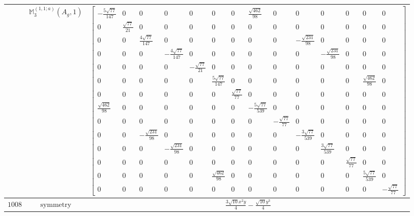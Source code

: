 \documentclass[fleqn,8pt,landscape]{jsarticle}
\begin{document}
\begin{longtable}{ccc}
$  $ & $ \mathbb{M}_{3}^{(1,1;a)}(A_{g},1) $ & $ \begin{bmatrix} - \frac{5 \sqrt{77}}{147} & 0 & 0 & 0 & 0 & 0 & 0 & \frac{\sqrt{462}}{98} & 0 & 0 & 0 & 0 & 0 & 0 \\ 0 & \frac{\sqrt{77}}{21} & 0 & 0 & 0 & 0 & 0 & 0 & 0 & 0 & 0 & 0 & 0 & 0 \\ 0 & 0 & \frac{4 \sqrt{77}}{147} & 0 & 0 & 0 & 0 & 0 & 0 & - \frac{\sqrt{231}}{98} & 0 & 0 & 0 & 0 \\ 0 & 0 & 0 & - \frac{4 \sqrt{77}}{147} & 0 & 0 & 0 & 0 & 0 & 0 & - \frac{\sqrt{231}}{98} & 0 & 0 & 0 \\ 0 & 0 & 0 & 0 & - \frac{\sqrt{77}}{21} & 0 & 0 & 0 & 0 & 0 & 0 & 0 & 0 & 0 \\ 0 & 0 & 0 & 0 & 0 & \frac{5 \sqrt{77}}{147} & 0 & 0 & 0 & 0 & 0 & 0 & \frac{\sqrt{462}}{98} & 0 \\ 0 & 0 & 0 & 0 & 0 & 0 & \frac{\sqrt{77}}{77} & 0 & 0 & 0 & 0 & 0 & 0 & 0 \\ \frac{\sqrt{462}}{98} & 0 & 0 & 0 & 0 & 0 & 0 & - \frac{5 \sqrt{77}}{539} & 0 & 0 & 0 & 0 & 0 & 0 \\ 0 & 0 & 0 & 0 & 0 & 0 & 0 & 0 & - \frac{\sqrt{77}}{77} & 0 & 0 & 0 & 0 & 0 \\ 0 & 0 & - \frac{\sqrt{231}}{98} & 0 & 0 & 0 & 0 & 0 & 0 & - \frac{3 \sqrt{77}}{539} & 0 & 0 & 0 & 0 \\ 0 & 0 & 0 & - \frac{\sqrt{231}}{98} & 0 & 0 & 0 & 0 & 0 & 0 & \frac{3 \sqrt{77}}{539} & 0 & 0 & 0 \\ 0 & 0 & 0 & 0 & 0 & 0 & 0 & 0 & 0 & 0 & 0 & \frac{\sqrt{77}}{77} & 0 & 0 \\ 0 & 0 & 0 & 0 & 0 & \frac{\sqrt{462}}{98} & 0 & 0 & 0 & 0 & 0 & 0 & \frac{5 \sqrt{77}}{539} & 0 \\ 0 & 0 & 0 & 0 & 0 & 0 & 0 & 0 & 0 & 0 & 0 & 0 & 0 & - \frac{\sqrt{77}}{77} \end{bmatrix} $ \\ \hline
$ 1008 $ & $ \text{symmetry} $ & $ \frac{3 \sqrt{10} x^{2} y}{4} - \frac{\sqrt{10} y^{3}}{4} $ \\

\end{longtable}
\end{document}
